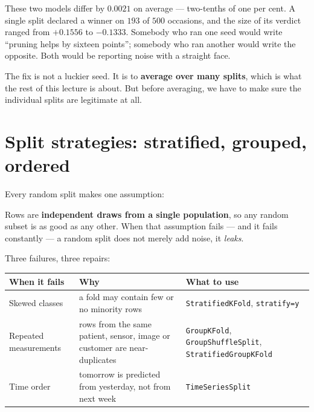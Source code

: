 \documentclass[11pt]{article}
\begin{document}
\begin{caution}
These two models differ by $0.0021$ on average --- two-tenths of one per cent.
A single split declared a winner on $193$ of $500$ occasions, and the size of
its verdict ranged from $+0.1556$ to $-0.1333$. Somebody who ran one seed
would write ``pruning helps by sixteen points''; somebody who ran another
would write the opposite. Both would be reporting noise with a straight face.
\end{caution}

The fix is not a luckier seed. It is to \textbf{average over many splits},
which is what the rest of this lecture is about. But before averaging, we have
to make sure the individual splits are legitimate at all.

\section{Split strategies: stratified, grouped, ordered}
\label{sec:strat}

Every random split makes one assumption:

\begin{keyidea}
Rows are \textbf{independent draws from a single population}, so any random
subset is as good as any other. When that assumption fails --- and it fails
constantly --- a random split does not merely add noise, it \emph{leaks}.
\end{keyidea}

Three failures, three repairs:

\begin{center}\small
\begin{tabular}{@{}lp{5.2cm}p{4.4cm}@{}}
  \toprule
  \textbf{When it fails} & \textbf{Why} & \textbf{What to use}\\
  \midrule
  Skewed classes & a fold may contain few or no minority rows &
    \texttt{StratifiedKFold}, \texttt{stratify=y}\\[3pt]
  Repeated measurements & rows from the same patient, sensor, image or
    customer are near-duplicates & \texttt{GroupKFold},
    \texttt{GroupShuffleSplit}, \texttt{StratifiedGroupKFold}\\[3pt]
  Time order & tomorrow is predicted from yesterday, not from next week &
    \texttt{TimeSeriesSplit}\\
  \bottomrule
\end{tabular}
\end{center}
\end{document}
